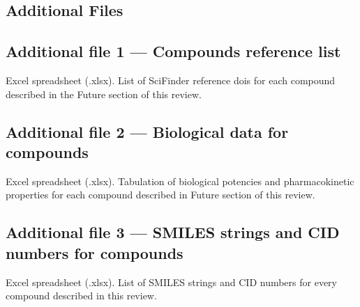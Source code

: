 \documentclass[twocolumn]{bmcart}%
\begin{document}
\begin{backmatter}
\section*{Additional Files}
\subsection*{Additional file 1 --- Compounds reference list}
Excel spreadsheet (.xlsx). List of SciFinder reference dois for each compound described in the Future section of this review.

\subsection*{Additional file 2 --- Biological data for compounds}
Excel spreadsheet (.xlsx). Tabulation of biological potencies and pharmacokinetic properties for each compound described in Future section of this review.

\subsection*{Additional file 3 --- SMILES strings and CID numbers for compounds}
Excel spreadsheet (.xlsx). List of SMILES strings and CID numbers for every compound described in this review.

\end{backmatter}
\end{document}
